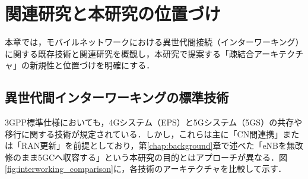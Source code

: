 \chapter{関連研究と本研究の位置づけ}
\label{chap:related}

本章では，モバイルネットワークにおける異世代間接続（インターワーキング）に関する既存技術と関連研究を概観し，本研究で提案する「疎結合アーキテクチャ」の新規性と位置づけを明確にする．

\section{異世代間インターワーキングの標準技術}

3GPP標準仕様においても，4Gシステム（EPS）と5Gシステム（5GS）の共存や移行に関する技術が規定されている．しかし，これらは主に「CN間連携」または「RAN更新」を前提としており，第\ref{chap:background}章で述べた「eNBを無改修のまま5GCへ収容する」という本研究の目的とはアプローチが異なる．図\ref{fig:interworking_comparison}に，各技術のアーキテクチャを比較して示す．

